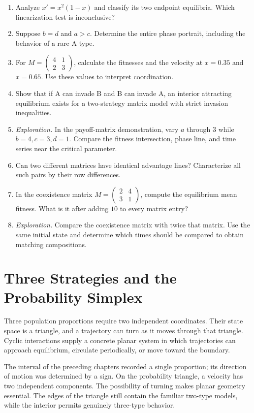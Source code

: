 \documentclass[11pt,oneside,openany]{book}
\theoremstyle{definition}
\theoremstyle{remark}
\newenvironment{exercises}{\begin{enumerate}[label=\thechapter.\arabic*,ref=\thechapter.\arabic*,leftmargin=2.8em,itemsep=6pt]}{\end{enumerate}}
\numberwithin{equation}{chapter}
\begin{document}
\begin{exercises}
\item Analyze $x'=x^2(1-x)$ and classify its two endpoint equilibria. Which linearization test is inconclusive?
\item Suppose $b=d$ and $a>c$. Determine the entire phase portrait, including the behavior of a rare A type.
\item For $M=\left(\begin{smallmatrix}4&1\\2&3\end{smallmatrix}\right)$, calculate the fitnesses and the velocity at $x=0.35$ and $x=0.65$. Use these values to interpret coordination.
\item Show that if A can invade B and B can invade A, an interior attracting equilibrium exists for a two-strategy matrix model with strict invasion inequalities.
\item \emph{Exploration.} In the payoff-matrix demonstration, vary $a$ through 3 while $b=4,c=3,d=1$. Compare the fitness intersection, phase line, and time series near the critical parameter.
\item Can two different matrices have identical advantage lines? Characterize all such pairs by their row differences.
\item In the coexistence matrix $M=\left(\begin{smallmatrix}2&4\\3&1\end{smallmatrix}\right)$, compute the equilibrium mean fitness. What is it after adding $10$ to every matrix entry?
\item \emph{Exploration.} Compare the coexistence matrix with twice that matrix. Use the same initial state and determine which times should be compared to obtain matching compositions.
\end{exercises}

\chapter{Three Strategies and the Probability Simplex}
\label{ch:simplex}

Three population proportions require two independent coordinates. Their state space is a triangle, and a trajectory can turn as it moves through that triangle. Cyclic interactions supply a concrete planar system in which trajectories can approach equilibrium, circulate periodically, or move toward the boundary.

The interval of the preceding chapters recorded a single proportion; its direction of motion was determined by a sign. On the probability triangle, a velocity has two independent components. The possibility of turning makes planar geometry essential. The edges of the triangle still contain the familiar two-type models, while the interior permits genuinely three-type behavior.
\end{document}
